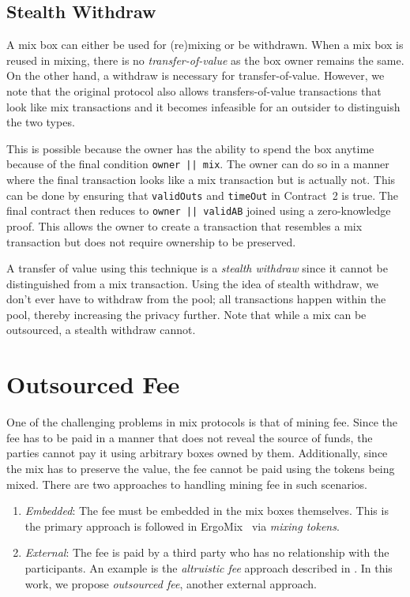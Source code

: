 \documentclass[runningheads]{llncs}
\newcommand{\ergomix}{ErgoMix\xspace}
\begin{document}
\subsection{Stealth Withdraw}
\label{stealth-withdraw}
A mix box can either be used for (re)mixing or be withdrawn. When a mix box is reused in mixing, there is no {\em transfer-of-value} as the box owner remains the same. On the other hand, a withdraw is necessary for transfer-of-value. However, we note that the original protocol also allows transfers-of-value transactions that look like mix transactions and it becomes infeasible for an outsider to distinguish the two types.

This is possible because the owner has the ability to spend the box anytime because of the final condition \texttt{owner || mix}. The owner can do so in a manner where the final transaction looks like a mix transaction but is actually not.
This can be done by ensuring that \texttt{validOuts} and \texttt{timeOut} in Contract~2 is true.
The final contract then reduces to \texttt{owner || validAB} joined using a zero-knowledge proof.
This allows the owner to create a transaction that resembles a mix transaction but does not require ownership to be preserved.

A transfer of value using this technique is a {\em stealth withdraw} since it cannot be distinguished from a mix transaction.
Using the idea of stealth withdraw, we don't ever have to withdraw from the pool;
all transactions happen within the pool, thereby increasing the privacy further.
Note that while a mix can be outsourced, a stealth withdraw cannot.

\section{Outsourced Fee}

One of the challenging problems in mix protocols is that of mining fee. Since the fee has to be paid in a manner that does not reveal the source of funds, the parties cannot pay it using arbitrary boxes owned by them. Additionally, since the mix has to preserve the value, the fee cannot be paid using the tokens being mixed. There are two approaches to handling mining fee in such scenarios.
\begin{enumerate}
\item {\em Embedded}: The fee must be embedded in the mix boxes themselves. This is the primary approach is followed in \ergomix~\cite{zerojoin} via {\em mixing tokens}.
\item {\em External}: The fee is paid by a third party who has no relationship with the participants. An example is the {\em altruistic fee} approach described in \cite{zerojoin}.
In this work, we propose {\em outsourced fee}, another external approach.
\end{enumerate}
\end{document}

